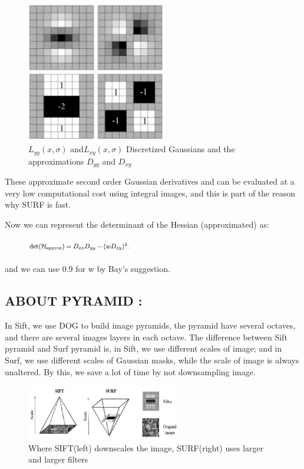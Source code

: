 \begin{figure}[H]
\centering
\includegraphics[width=0.55\textwidth]{img/surf4.PNG}
\caption{${L_{yy}(x,\sigma)}$ and${L_{xy}(x,\sigma)}$ Discretized
Gaussians and the approximations $D_{yy}$ and $D_{xy}$}
\label{fig:surf1}
\end{figure}

These approximate second order Gaussian derivatives and can be evaluated at a very low computational cost using integral images, and this is part of the reason why SURF is fast.

Now we can represent the determinant of the Hessian (approximated) as:

\begin{figure}[H]
\centering
\includegraphics[width= 0.4\textwidth]{img/det.jpeg}

\label{fig:surfdet}
\end{figure}
and we can use 0.9 for w by Bay’s suggestion.

\subsection{ABOUT PYRAMID :}

In Sift, we use DOG to build image pyramids, the pyramid have several octaves, and there are several images layers in each octave. The difference between Sift pyramid and Surf pyramid is, in Sift, we use different scales of image; and in Surf, we use different scales of Gaussian masks, while the scale of image is always unaltered. By this, we save a lot of time by not downsampling image.

\begin{figure}[H]
\centering
\includegraphics[width=0.6\textwidth]{img/surf2.png}
\caption{Where SIFT(left) downscales the image,
SURF(right) uses larger and larger filters}
\label{fig:surf2}
\end{figure}

